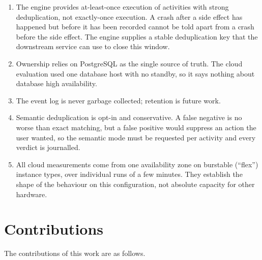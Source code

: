 \begin{enumerate}[leftmargin=*, itemsep=2pt]
  \item The engine provides at-least-once execution of activities with strong
    deduplication, not exactly-once execution. A crash after a side effect has
    happened but before it has been recorded cannot be told apart from a crash
    before the side effect. The engine supplies a stable deduplication key
    that the downstream service can use to close this window.
  \item Ownership relies on PostgreSQL as the single source of truth. The
    cloud evaluation used one database host with no standby, so it says
    nothing about database high availability.
  \item The event log is never garbage collected; retention is future work.
  \item Semantic deduplication is opt-in and conservative. A false negative is
    no worse than exact matching, but a false positive would suppress an
    action the user wanted, so the semantic mode must be requested per
    activity and every verdict is journalled.
  \item All cloud measurements come from one availability zone on burstable
    (``flex'') instance types, over individual runs of a few minutes. They
    establish the shape of the behaviour on this configuration, not absolute
    capacity for other hardware.
\end{enumerate}

\section{Contributions}

The contributions of this work are as follows.

